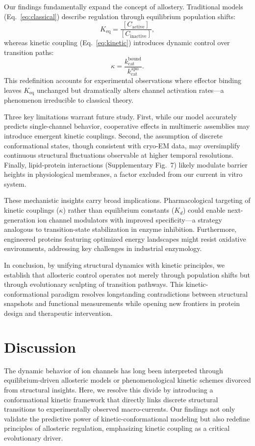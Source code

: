 \documentclass[a4paper,12pt]{article}
\begin{document}
	Our findings fundamentally expand the concept of allostery. Traditional models (Eq.~\eqref{eq:classical}) describe regulation through equilibrium population shifts:  
	\begin{equation}
		K_{\text{eq}} = \frac{[C_{\text{active}}]}{[C_{\text{inactive}}]}, \label{eq:classical}
	\end{equation}  
	whereas kinetic coupling (Eq.~\eqref{eq:kinetic}) introduces dynamic control over transition paths:  
	\begin{equation}
		\kappa = \frac{k_{\text{cat}}^{\text{bound}}}{k_{\text{cat}}^{\text{apo}}}. \label{eq:kinetic}
	\end{equation}  
	This redefinition accounts for experimental observations where effector binding leaves $K_{\text{eq}}$ unchanged but dramatically alters channel activation rates—a phenomenon irreducible to classical theory.  
	
	Three key limitations warrant future study. First, while our model accurately predicts single-channel behavior, cooperative effects in multimeric assemblies may introduce emergent kinetic couplings. Second, the assumption of discrete conformational states, though consistent with cryo-EM data, may oversimplify continuous structural fluctuations observable at higher temporal resolutions. Finally, lipid-protein interactions (Supplementary Fig.~7) likely modulate barrier heights in physiological membranes, a factor excluded from our current in vitro system.  
	
	These mechanistic insights carry broad implications. Pharmacological targeting of kinetic couplings ($\kappa$) rather than equilibrium constants ($K_d$) could enable next-generation ion channel modulators with improved specificity—a strategy analogous to transition-state stabilization in enzyme inhibition. Furthermore, engineered proteins featuring optimized energy landscapes might resist oxidative environments, addressing key challenges in industrial enzymology.  
	
	In conclusion, by unifying structural dynamics with kinetic principles, we establish that allosteric control operates not merely through population shifts but through evolutionary sculpting of transition pathways. This kinetic-conformational paradigm resolves longstanding contradictions between structural snapshots and functional measurements while opening new frontiers in protein design and therapeutic intervention.  
	
	\section{Discussion}
	The dynamic behavior of ion channels has long been interpreted through equilibrium-driven allosteric models or phenomenological kinetic schemes divorced from structural insights. Here, we resolve this divide by introducing a conformational kinetic framework that directly links discrete structural transitions to experimentally observed macro-currents. Our findings not only validate the predictive power of kinetic-conformational modeling but also redefine principles of allosteric regulation, emphasizing kinetic coupling as a critical evolutionary driver.  
\end{document}
